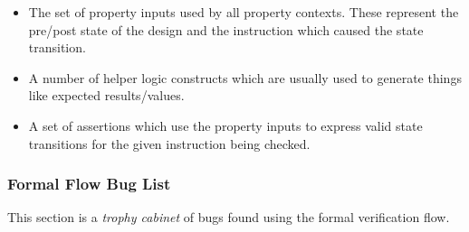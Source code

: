 \begin{itemize}
\item The set of property inputs used by all property contexts.
    These represent the pre/post state of the design and the instruction
    which caused the state transition.
\item A number of helper logic constructs which are usually used to generate
    things like expected results/values.
\item A set of assertions which use the property inputs to express valid
    state transitions for the given instruction being checked.
\end{itemize}

\subsubsection{Formal Flow Bug List}

This section is a {\em trophy cabinet} of bugs found using the formal
verification flow.

